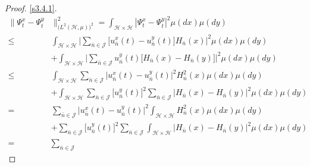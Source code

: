 \documentclass[review, onefignum, onetabnum]{siamart171218}
\begin{document}
\begin{proof}
\eqref{s3.4.1}.
%
\begin{equation}
\label{s3.8.1}
    \begin{aligned}
        \| \Psi_t ^ x - \Psi_t ^ y & \|_{
            \big(
                L^2(\mathcal{H},\mu)
            \big)^2
        }^2
            =
                \int_{\mathcal{H}\times \mathcal{H}}
                |\Psi_t^x - \Psi_t^y|^2 \mu(dx) \mu(dy)
            \\
            \le&
            \int_{\mathcal{H} \times \mathcal{H}}
                \Big|
                    \sum_{\bar n\in \mathcal{J}}
                    \big[
                        u_{\bar n} ^ x(t) - u_{\bar n} ^ y(t)
                    \big]
                    H_{\bar n}(x)
                \Big|^2
                \mu(dx) \mu(dy)
            \\
            &+
            \int_{\mathcal{H}\times \mathcal{H}}
            \Big|
                \sum_{\bar n\in \mathcal{J}}
                    u_{\bar n}^y(t)
                    \big[
                        H_{\bar n}(x) - H_{\bar n}(y)
                    \big]
            \Big|^2
            \mu(dx) \mu(dy)
            \\
            \le&
            \int_{\mathcal{H} \times \mathcal{H}}
            \sum_{\bar n\in \mathcal{J}}
            \big|
                u_{\bar n}^x(t) - u_{\bar n}^y(t)
            \big |^2
            H_{\bar n}^2(x)
            \mu(dx) \mu(dy)
            \\
            &+
            \int_{\mathcal{H}\times \mathcal{H}}
            \sum_{\bar n\in \mathcal{J}}
            \big[u_{\bar n} ^ y(t) \big]^2
            \sum_{\bar n\in \mathcal{J}}
            \big|
                H_{\bar n}(x) - H_{\bar n}(y)
            \big|^2
            \mu(dx) \mu(dy)
            \\
            =&
            \sum_{\bar n\in \mathcal{J}}
            \big|
                u_{\bar n}^x(t)-u_{\bar n}^y(t)
            \big |^2
            \int_{\mathcal{H} \times \mathcal{H}}
            H_{\bar n}^2 (x)
            \mu(dx) \mu(dy)
            \\
            &+
            \sum_{\bar n\in \mathcal{J}}
            \big[
                u_{\bar n}^y(t)
            \big] ^ 2
            \sum_{\bar n\in \mathcal{J}}
            \int_{\mathcal{H}\times \mathcal{H}}
            \big|
                H_{\bar n}(x) - H_{\bar n}(y)
            \big| ^ 2 \mu(dx)\mu(dy)
            \\
            =&
            \sum_{\bar n\in \mathcal{J}}

\end{aligned}
\end{equation}
\end{proof}
\end{document}
